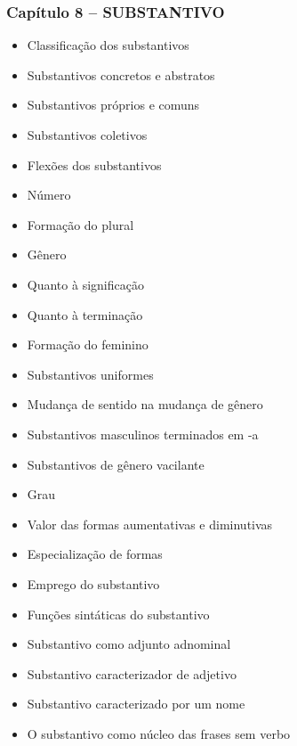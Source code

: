\documentclass[a4paper,12pt]{article}[abntex2]
\begin{document}
\subsubsection*{Capítulo 8 – SUBSTANTIVO}
\begin{itemize}
    \item Classificação dos substantivos
    \item Substantivos concretos e abstratos
    \item Substantivos próprios e comuns
    \item Substantivos coletivos
    \item Flexões dos substantivos
    \item Número
    \item Formação do plural
    \item Gênero
    \item Quanto à significação
    \item Quanto à terminação
    \item Formação do feminino
    \item Substantivos uniformes
    \item Mudança de sentido na mudança de gênero
    \item Substantivos masculinos terminados em -a
    \item Substantivos de gênero vacilante
    \item Grau
    \item Valor das formas aumentativas e diminutivas
    \item Especialização de formas
    \item Emprego do substantivo
    \item Funções sintáticas do substantivo
    \item Substantivo como adjunto adnominal
    \item Substantivo caracterizador de adjetivo
    \item Substantivo caracterizado por um nome
    \item O substantivo como núcleo das frases sem verbo
\end{itemize}
\end{document}
